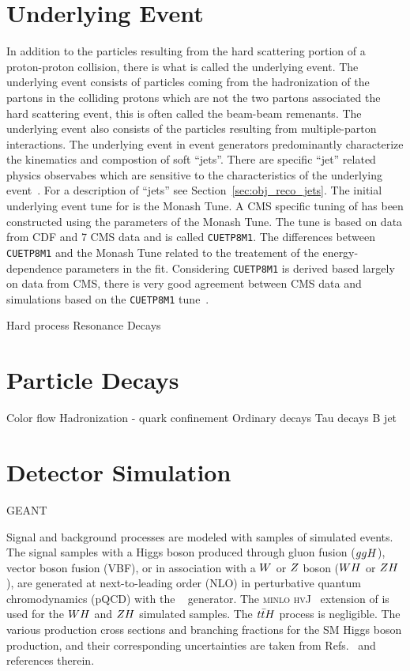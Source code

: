 \section{Underlying Event}
In addition to the particles resulting from the hard scattering portion of a proton-proton collision,
there is what is called the underlying event. The underlying event consists of particles coming from
the hadronization of the partons in the colliding protons which are not the two partons associated the
hard scattering event, this is often called the beam-beam remenants. The underlying event also
consists of the particles resulting from multiple-parton interactions. The underlying event in 
event generators predominantly characterize the kinematics and compostion of soft ``jets''.
There are specific ``jet'' related physics observabes which are sensitive to the characteristics of the underlying
event~\cite{Khachatryan:2015pea, Field:cdf2008}. For a description of ``jets'' see Section~\ref{sec:obj_reco_jets}.
The initial underlying event tune for  is the Monash Tune. A CMS specific tuning of 
 has been constructed using the parameters of the Monash Tune. The tune is based
on data from CDF and 7 \TeV CMS data and is called \texttt{CUETP8M1}. The differences between
\texttt{CUETP8M1} and the Monash Tune related to the treatement of the energy-dependence 
parameters in the fit. Considering \texttt{CUETP8M1} is derived based largely on data from
CMS, there is very good agreement between CMS data and simulations based on the
\texttt{CUETP8M1} tune~\cite{Khachatryan:2015pea}. 
 



Hard process
Resonance Decays

\section{Particle Decays}
Color flow
Hadronization - quark confinement
Ordinary decays
    Tau decays
    B jet

\section{Detector Simulation}
GEANT


Signal and background processes are modeled with samples of simulated events.
The signal samples with a Higgs boson produced through gluon fusion ($ggH$), vector boson fusion (VBF),
or in association with a $W$ or $Z$ boson ($WH$ or $ZH$), are generated at next-to-leading order (NLO) in perturbative quantum chromodynamics (pQCD) with the ~\cite{Nason:2004rx,Frixione:2007vw, Alioli:2010xd, Alioli:2010xa, Alioli:2008tz} generator. The \textsc{minlo hvJ}~\cite{Luisoni:2013kna} extension of  is used for the $WH$ and $ZH$ simulated samples. 
The $t\bar{t}H$ process is negligible.
The various production cross sections and branching fractions for the SM Higgs boson production, and their corresponding uncertainties are taken from Refs.~\cite{deFlorian:2016spz,Denner:2011mq,Ball:2011mu} and references therein.

